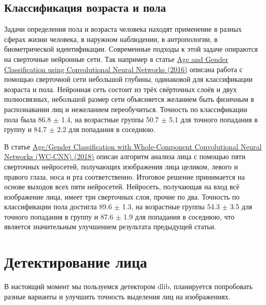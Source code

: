 \documentclass[a4paper,14pt]{extarticle}
\newcommand{\bibref}[3]{\hyperlink{#1}{#2 (#3)}} %
\begin{document}
    \subsection{Классификация возраста и пола}
    \par Задачи определения пола и возраста человека находят применение в разных сферах жизни человека, в наружном наблюдении, в антропологии, в биометрической идентификации. Современные подходы к этой задаче опираются на сверточные нейронные сети. Так например в статье \bibref{hassner}{Age and Gender Classification using Convolutional Neural Networks}{2016} описана работа с помощью сверточной сети небольшой глубины, одинаковой для классификации возраста и пола. Нейронная сеть состоит из трёх свёрточных слоёв и двух полносвязных, небольшой размер сети объясняется желанием быть физичным в распознавании лиц и нежеланием переобучиться. Точность по классификации пола была 86.8 $\pm$ 1.4, на возрастные группы 50.7 $\pm$ 5.1 для точного попадания в группу и 84.7 $\pm$ 2.2 для попадания в соседнюю.
    \par В статье \bibref{INDIA}{Age/Gender Classification with Whole-Component Convolutional Neural Networks (WC-CNN)}{2018} описан алгоритм анализа лица с помощью пяти сверточных нейросетей, получающих изображения лица целиком, левого и правого глаза, носа и рта соответственно. Итоговое решение принимается на основе выходов всех пяти нейросетей. Нейросеть, получающая на вход всё изображение лица, имеет три сверточных слоя, прочие по два. Точность по классификации пола достигла 89.6 $\pm$ 1.3, на возрастные группы 54.3 $\pm$ 3.5 для точного попадания в группу и 87.6 $\pm$ 1.9 для попадания в соседнюю, что является значительным улучшением результата предыдущей статьи.
    \newpage

    \section{Детектирование лица}
    В настоящий момент мы пользуемся детектором dlib, планируется попробовать разные варианты и улучшить точность выделения лиц на изображениях.
    \newpage
\end{document}
